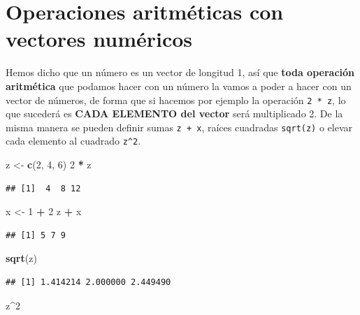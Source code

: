 \documentclass[11pt,]{book}
\newenvironment{Shaded}{\begin{snugshade}}{\end{snugshade}}
\newcommand{\DecValTok}[1]{\textcolor[rgb]{0.06,0.06,0.06}{#1}}
\newcommand{\KeywordTok}[1]{\textcolor[rgb]{0.27,0.27,0.27}{\textbf{#1}}}
\newcommand{\NormalTok}[1]{#1}
\newcommand{\OperatorTok}[1]{\textcolor[rgb]{0.43,0.43,0.43}{\textbf{#1}}}
\newcommand{\StringTok}[1]{\textcolor[rgb]{0.5,0.5,0.5}{#1}}
\begin{document}
\hypertarget{operaciones-aritmuxe9ticas-con-vectores-numuxe9ricos}{%
\section{Operaciones aritméticas con vectores numéricos}\label{operaciones-aritmuxe9ticas-con-vectores-numuxe9ricos}}

Hemos dicho que un número es un vector de longitud 1, así que \textbf{toda operación aritmética} que podamos hacer con un número la vamos a poder a hacer con un vector de números, de forma que si hacemos por ejemplo la operación \texttt{2\ *\ z}, lo que sucederá es \textbf{CADA ELEMENTO del vector} será multiplicado 2. De la misma manera se pueden definir sumas \texttt{z\ +\ x}, raíces cuadradas \texttt{sqrt(z)} o elevar cada elemento al cuadrado \texttt{z\^{}2}.

\begin{Shaded}
\begin{Highlighting}[]
\NormalTok{z <-}\StringTok{ }\KeywordTok{c}\NormalTok{(}\DecValTok{2}\NormalTok{, }\DecValTok{4}\NormalTok{, }\DecValTok{6}\NormalTok{)}
\DecValTok{2} \OperatorTok{*}\StringTok{ }\NormalTok{z}
\end{Highlighting}
\end{Shaded}

\begin{verbatim}
## [1]  4  8 12
\end{verbatim}

\begin{Shaded}
\begin{Highlighting}[]
\NormalTok{x <-}\StringTok{ }\DecValTok{1} \OperatorTok{+}\StringTok{ }\DecValTok{2}
\NormalTok{z }\OperatorTok{+}\StringTok{ }\NormalTok{x}
\end{Highlighting}
\end{Shaded}

\begin{verbatim}
## [1] 5 7 9
\end{verbatim}

\begin{Shaded}
\begin{Highlighting}[]
\KeywordTok{sqrt}\NormalTok{(z)}
\end{Highlighting}
\end{Shaded}

\begin{verbatim}
## [1] 1.414214 2.000000 2.449490
\end{verbatim}

\begin{Shaded}
\begin{Highlighting}[]
\NormalTok{z}\OperatorTok{^}\DecValTok{2}
\end{Highlighting}
\end{Shaded}
\end{document}
